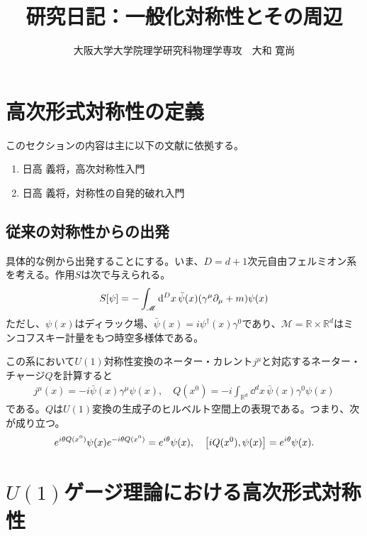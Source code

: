 \documentclass{jarticle}
\title{{\bf 研究日記：一般化対称性とその周辺}}
\author{大阪大学大学院理学研究科物理学専攻　大和 寛尚}
\date{}
\theoremstyle{definition}
\numberwithin{equation}{section}
\begin{document}
\maketitle
\tableofcontents

\section{高次形式対称性の定義}
このセクションの内容は主に以下の文献に依拠する。
\begin{enumerate}
\item 日高 義将，高次対称性入門
\item 日高 義将，対称性の自発的破れ入門
\end{enumerate}
\subsection{従来の対称性からの出発}
具体的な例から出発することにする。いま、$D = d + 1$次元自由フェルミオン系を考える。作用$S$は次で与えられる。
\begin{align}
  S[\psi] = -\int_{\mathscr{M}} \dd^D x \, \bar{\psi}(x)\qty(\gamma^\mu\partial_\mu + m) \psi(x)
\end{align}
ただし、$\psi(x)$はディラック場、$\bar{\psi}(x) = i\psi^\dagger(x)\gamma^0$であり、$\mathscr{M} = \mathbb{R} \times \mathbb{R}^d$はミンコフスキー計量をもつ時空多様体である。

この系において$U(1)$対称性変換のネーター・カレント$j^\mu$と対応するネーター・チャージ$Q$を計算すると
\begin{align}
  j^\mu(x) = -i\bar{\psi}(x)\gamma^\mu\psi(x), \quad Q(x^0) = -i\int_{\mathbb{R}^d} \dd^d x\, \bar{\psi}(x)\gamma^0 \psi(x)
\end{align}
である。$Q$は$U(1)$変換の生成子のヒルベルト空間上の表現である。つまり、次が成り立つ。
\begin{align}
  e^{i\theta Q(x^0)} \psi(x) e^{-i\theta Q(x^0)} = e^{i\theta} \psi(x), \quad
  \qty[iQ(x^0), \psi(x)] = e^{i\theta} \psi(x).
\end{align}


\section{$U(1)$ゲージ理論における高次形式対称性}
\end{document}
